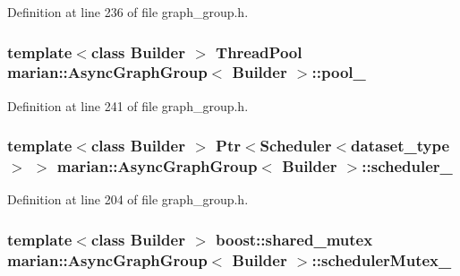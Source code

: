 Definition at line 236 of file graph\+\_\+group.\+h.

\subsubsection[{\texorpdfstring{pool\+\_\+}{pool_}}]{\setlength{\rightskip}{0pt plus 5cm}template$<$class Builder $>$ Thread\+Pool {\bf marian\+::\+Async\+Graph\+Group}$<$ Builder $>$\+::pool\+\_\+\hspace{0.3cm}{\ttfamily [private]}}\hypertarget{classmarian_1_1AsyncGraphGroup_a1e7cb229894520315af6d9036daeb957}{}\label{classmarian_1_1AsyncGraphGroup_a1e7cb229894520315af6d9036daeb957}


Definition at line 241 of file graph\+\_\+group.\+h.

\subsubsection[{\texorpdfstring{scheduler\+\_\+}{scheduler_}}]{\setlength{\rightskip}{0pt plus 5cm}template$<$class Builder $>$ {\bf Ptr}$<${\bf Scheduler}$<${\bf dataset\+\_\+type}$>$ $>$ {\bf marian\+::\+Async\+Graph\+Group}$<$ Builder $>$\+::scheduler\+\_\+\hspace{0.3cm}{\ttfamily [private]}}\hypertarget{classmarian_1_1AsyncGraphGroup_a3847200bdb1e584e006457113f3aafd1}{}\label{classmarian_1_1AsyncGraphGroup_a3847200bdb1e584e006457113f3aafd1}


Definition at line 204 of file graph\+\_\+group.\+h.

\subsubsection[{\texorpdfstring{scheduler\+Mutex\+\_\+}{schedulerMutex_}}]{\setlength{\rightskip}{0pt plus 5cm}template$<$class Builder $>$ boost\+::shared\+\_\+mutex {\bf marian\+::\+Async\+Graph\+Group}$<$ Builder $>$\+::scheduler\+Mutex\+\_\+\hspace{0.3cm}{\ttfamily [private]}}\hypertarget{classmarian_1_1AsyncGraphGroup_a0592c560087d3adae51f637a383e1511}{}\label{classmarian_1_1AsyncGraphGroup_a0592c560087d3adae51f637a383e1511}


